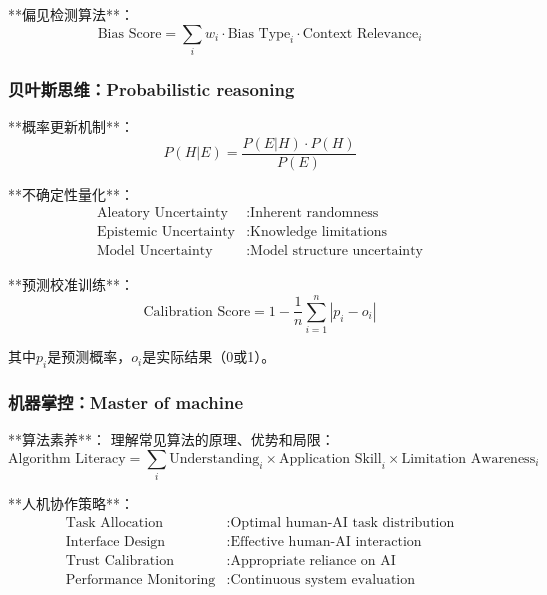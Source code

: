 **偏见检测算法**：
\begin{equation}
\text{Bias Score} = \sum_{i} w_i \cdot \text{Bias Type}_i \cdot \text{Context Relevance}_i
\end{equation}

\subsubsection{贝叶斯思维：Probabilistic reasoning} %

**概率更新机制**：
\begin{equation}
P(H|E) = \frac{P(E|H) \cdot P(H)}{P(E)}
\end{equation}

**不确定性量化**：
\begin{align}
\text{Aleatory Uncertainty} &: \text{Inherent randomness} \\
\text{Epistemic Uncertainty} &: \text{Knowledge limitations} \\
\text{Model Uncertainty} &: \text{Model structure uncertainty}
\end{align}

**预测校准训练**：
\begin{equation}
\text{Calibration Score} = 1 - \frac{1}{n} \sum_{i=1}^n |p_i - o_i|
\end{equation}

其中$p_i$是预测概率，$o_i$是实际结果（0或1）。

\subsubsection{机器掌控：Master of machine} %

**算法素养**：
理解常见算法的原理、优势和局限：
\begin{equation}
\text{Algorithm Literacy} = \sum_{i} \text{Understanding}_i \times \text{Application Skill}_i \times \text{Limitation Awareness}_i
\end{equation}

**人机协作策略**：
\begin{align}
\text{Task Allocation} &: \text{Optimal human-AI task distribution} \\
\text{Interface Design} &: \text{Effective human-AI interaction} \\
\text{Trust Calibration} &: \text{Appropriate reliance on AI} \\
\text{Performance Monitoring} &: \text{Continuous system evaluation}
\end{align}

